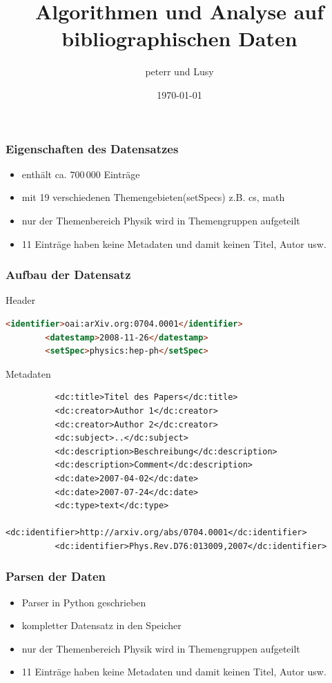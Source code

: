 \documentclass[12pt,utf8]{beamer}
\begin{document}
\title{Algorithmen und Analyse auf bibliographischen Daten}   
\author{peterr und Lusy} 
\date{\today} 

\begin{frame}
	\titlepage
\end{frame}

\begin{frame}
	\frametitle{Eigenschaften des Datensatzes}
	\begin{itemize}
		\item  enthält ca. $700\,000$ Einträge 
		\item  mit 19 verschiedenen Themengebieten(setSpecs) z.B. cs, math 
		\item  nur der Themenbereich Physik wird in Themengruppen aufgeteilt
		\item  11 Einträge haben keine Metadaten und damit keinen Titel, Autor usw.
	\end{itemize} 
\end{frame}
\begin{frame}[fragile]
	\frametitle{Aufbau der Datensatz}
	\begin{block}{Header}
	\begin{lstlisting}[language=HTML]
		<identifier>oai:arXiv.org:0704.0001</identifier>
		<datestamp>2008-11-26</datestamp>
		<setSpec>physics:hep-ph</setSpec>
	\end{lstlisting}
	\end{block}
	\begin{block}{Metadaten}
		\begin{lstlisting}
		  <dc:title>Titel des Papers</dc:title>
		  <dc:creator>Author 1</dc:creator>
		  <dc:creator>Author 2</dc:creator>
		  <dc:subject>..</dc:subject>
		  <dc:description>Beschreibung</dc:description>
		  <dc:description>Comment</dc:description>
		  <dc:date>2007-04-02</dc:date>
		  <dc:date>2007-07-24</dc:date>
		  <dc:type>text</dc:type>
		  <dc:identifier>http://arxiv.org/abs/0704.0001</dc:identifier>
		  <dc:identifier>Phys.Rev.D76:013009,2007</dc:identifier>
		\end{lstlisting}
	\end{block}
\end{frame}
\begin{frame}
	\frametitle{Parsen der Daten}
	\begin{itemize}
		\item  Parser in Python geschrieben 
		\item  kompletter Datensatz in den Speicher
		\item  nur der Themenbereich Physik wird in Themengruppen aufgeteilt
		\item  11 Einträge haben keine Metadaten und damit keinen Titel, Autor usw.
	\end{itemize}
\end{frame}
\end{document}
